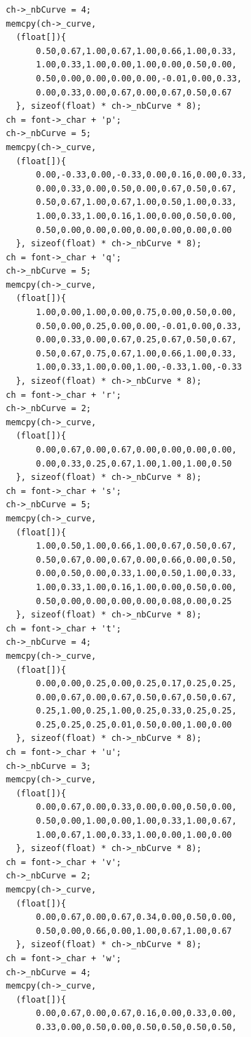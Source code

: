 \documentclass[12pt, a4paper]{article}
\begin{document}
\begin{scriptsize}
\begin{ttfamily}
\begin{lstlisting}
  ch->_nbCurve = 4;
  memcpy(ch->_curve, 
    (float[]){
        0.50,0.67,1.00,0.67,1.00,0.66,1.00,0.33,
        1.00,0.33,1.00,0.00,1.00,0.00,0.50,0.00,
        0.50,0.00,0.00,0.00,0.00,-0.01,0.00,0.33,
        0.00,0.33,0.00,0.67,0.00,0.67,0.50,0.67
    }, sizeof(float) * ch->_nbCurve * 8);
  ch = font->_char + 'p';
  ch->_nbCurve = 5;
  memcpy(ch->_curve, 
    (float[]){
        0.00,-0.33,0.00,-0.33,0.00,0.16,0.00,0.33,
        0.00,0.33,0.00,0.50,0.00,0.67,0.50,0.67,
        0.50,0.67,1.00,0.67,1.00,0.50,1.00,0.33,
        1.00,0.33,1.00,0.16,1.00,0.00,0.50,0.00,
        0.50,0.00,0.00,0.00,0.00,0.00,0.00,0.00
    }, sizeof(float) * ch->_nbCurve * 8);
  ch = font->_char + 'q';
  ch->_nbCurve = 5;
  memcpy(ch->_curve, 
    (float[]){
        1.00,0.00,1.00,0.00,0.75,0.00,0.50,0.00,
        0.50,0.00,0.25,0.00,0.00,-0.01,0.00,0.33,
        0.00,0.33,0.00,0.67,0.25,0.67,0.50,0.67,
        0.50,0.67,0.75,0.67,1.00,0.66,1.00,0.33,
        1.00,0.33,1.00,0.00,1.00,-0.33,1.00,-0.33
    }, sizeof(float) * ch->_nbCurve * 8);
  ch = font->_char + 'r';
  ch->_nbCurve = 2;
  memcpy(ch->_curve, 
    (float[]){
        0.00,0.67,0.00,0.67,0.00,0.00,0.00,0.00,
        0.00,0.33,0.25,0.67,1.00,1.00,1.00,0.50
    }, sizeof(float) * ch->_nbCurve * 8);
  ch = font->_char + 's';
  ch->_nbCurve = 5;
  memcpy(ch->_curve, 
    (float[]){
        1.00,0.50,1.00,0.66,1.00,0.67,0.50,0.67,
        0.50,0.67,0.00,0.67,0.00,0.66,0.00,0.50,
        0.00,0.50,0.00,0.33,1.00,0.50,1.00,0.33,
        1.00,0.33,1.00,0.16,1.00,0.00,0.50,0.00,
        0.50,0.00,0.00,0.00,0.00,0.08,0.00,0.25
    }, sizeof(float) * ch->_nbCurve * 8);
  ch = font->_char + 't';
  ch->_nbCurve = 4;
  memcpy(ch->_curve, 
    (float[]){
        0.00,0.00,0.25,0.00,0.25,0.17,0.25,0.25,
        0.00,0.67,0.00,0.67,0.50,0.67,0.50,0.67,
        0.25,1.00,0.25,1.00,0.25,0.33,0.25,0.25,
        0.25,0.25,0.25,0.01,0.50,0.00,1.00,0.00
    }, sizeof(float) * ch->_nbCurve * 8);
  ch = font->_char + 'u';
  ch->_nbCurve = 3;
  memcpy(ch->_curve, 
    (float[]){
        0.00,0.67,0.00,0.33,0.00,0.00,0.50,0.00,
        0.50,0.00,1.00,0.00,1.00,0.33,1.00,0.67,
        1.00,0.67,1.00,0.33,1.00,0.00,1.00,0.00
    }, sizeof(float) * ch->_nbCurve * 8);
  ch = font->_char + 'v';
  ch->_nbCurve = 2;
  memcpy(ch->_curve, 
    (float[]){
        0.00,0.67,0.00,0.67,0.34,0.00,0.50,0.00,
        0.50,0.00,0.66,0.00,1.00,0.67,1.00,0.67
    }, sizeof(float) * ch->_nbCurve * 8);
  ch = font->_char + 'w';
  ch->_nbCurve = 4;
  memcpy(ch->_curve, 
    (float[]){
        0.00,0.67,0.00,0.67,0.16,0.00,0.33,0.00,
        0.33,0.00,0.50,0.00,0.50,0.50,0.50,0.50,

\end{lstlisting}
\end{ttfamily}
\end{scriptsize}
\end{document}
